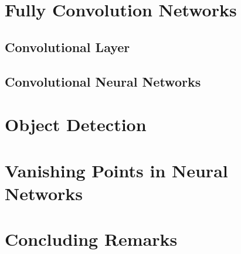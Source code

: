 \begin{spacing}{1.5}
\section{Fully Convolution Networks}
\label{sec:LR_FCN}

\subsection{Convolutional Layer}

\subsection{Convolutional Neural Networks}

\section{Object Detection}
\label{sec:LR_objectdetection}



\section{Vanishing Points in Neural Networks}
\label{sec:LR_vpinNN}

\section{Concluding Remarks}

\end{spacing}
\newpage
